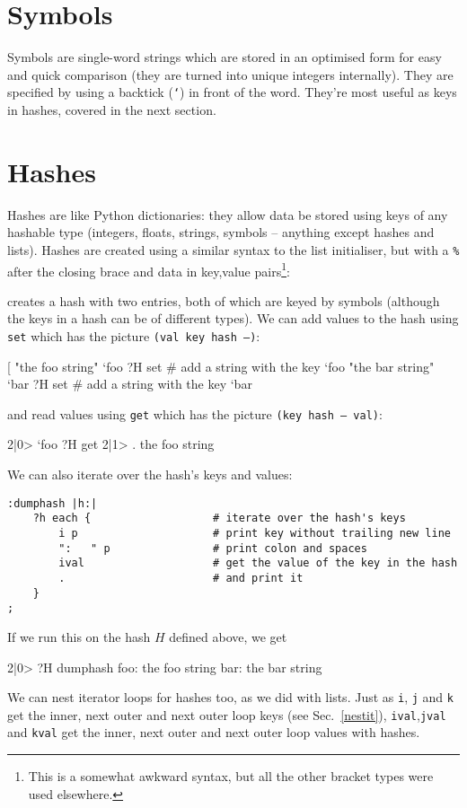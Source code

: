 \section{Symbols}
Symbols are single-word strings which are stored in an optimised form for easy
and quick comparison (they are turned into unique integers
internally). They are specified by using a backtick (\texttt{`}) in front of
the word. They're most useful as keys in hashes, covered in the next section.

\section{Hashes}
Hashes are like Python dictionaries: they allow data be stored using keys of any hashable type (integers, floats,
strings, symbols -- anything except hashes and lists). Hashes are created
using a similar syntax to the list initialiser, but with a \texttt{\%} after
the closing brace and data in key,value pairs\footnote{This is a somewhat
awkward syntax, but all the other bracket types were used elsewhere.}:
\indw{[\%]}
\end{v}
creates a hash with two entries, both of which are keyed by symbols (although
the keys in a hash can be of different types). We can add values to the hash
using \texttt{set} which has the picture \texttt{(val key hash --)}:

\begin{v}
[%
"the foo string" `foo ?H set    # add a string with the key `foo
"the bar string" `bar ?H set    # add a string with the key `bar
\end{v}
and read values using \texttt{get} which has the picture \texttt{(key hash -- val)}:
\begin{v}
2|0> `foo ?H get
2|1> .
the foo string
\end{v}
We can also iterate over the hash's keys and values:
\begin{lstlisting}
:dumphash |h:|
    ?h each {                   # iterate over the hash's keys
        i p                     # print key without trailing new line
        ":   " p                # print colon and spaces
        ival                    # get the value of the key in the hash
        .                       # and print it
    }
;
\end{lstlisting}
If we run this on the hash $H$ defined above, we get
\begin{v}
2|0> ?H dumphash
foo:   the foo string
bar:   the bar string
\end{v}
We can nest iterator loops for hashes too, as we did with lists.
Just as \texttt{i}, \texttt{j} and \texttt{k} get the inner, next outer
and next outer loop keys (see Sec.~\ref{nestit}), \texttt{ival},\texttt{jval} and \texttt{kval} get
the inner, next outer and next outer loop values with hashes.


